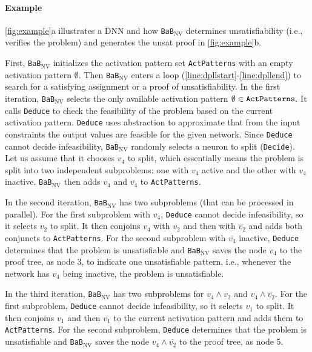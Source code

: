\documentclass[oneside,11pt,dvipsnames]{book}
\newcommand{\functiontextformat}[1]{\textrm{\texttt{#1}}}
\newcommand{\bab}{\texttt{BaB$_{\text{NV}}$}}
\begin{document}
\paragraph{Example} \autoref{fig:example}a illustrates a DNN and how \bab{} determines unsatisfiability (i.e., verifies the problem) and generates the unsat proof in \autoref{fig:example}b.

First, \bab{} initializes the activation pattern set \functiontextformat{ActPatterns} with an empty activation pattern $\emptyset$. Then \bab{} enters a loop (\autoref{line:dpllstart}-\autoref{line:dpllend}) to search for a satisfying assignment or a proof of unsatisfiability. In the first iteration, \bab{} selects the only available activation pattern $\emptyset \in \functiontextformat{ActPatterns}$. 
It calls \functiontextformat{Deduce} to check the feasibility of the problem based on the current activation pattern. \functiontextformat{Deduce} uses abstraction to approximate that from the input constraints the output values are feasible for the given network. 
Since \functiontextformat{Deduce} cannot decide infeasibility, \bab{} randomly selects a neuron to split (\functiontextformat{Decide}). Let us assume that it chooses $v_4$ to split, which essentially means the problem is split into two independent subproblems: one with $v_4$ active and the other with $v_4$ inactive.
\bab{} then adds $v_4$ and $\overline{v_4}$ to \functiontextformat{ActPatterns}.

In the second iteration, \bab{} has two subproblems (that can be processed in parallel). For the first subproblem with $v_4$, \functiontextformat{Deduce} cannot decide infeasibility, so it selects $v_2$ to split. It then conjoins $v_4$ with $v_2$ and then with $\overline{v_2}$ and adds both conjuncts to \texttt{ActPatterns}. 
For the second subproblem with $\overline{v_4}$ inactive, \functiontextformat{Deduce} determines that the problem is unsatisfiable and \bab{} saves the node $v_4$ to the proof tree, as node 3, to indicate one unsatisfiable pattern, i.e., whenever the network has $v_4$ being inactive, the problem is unsatisfiable.

In the third iteration, \bab{} has two subproblems for $v_4 \land v_2$ and $v_4 \land \overline{v_2}$. For the first subproblem, \functiontextformat{Deduce} cannot decide infeasibility, so it selects $v_1$ to split. It then conjoins $v_1$ and then $\overline{v_1}$ to the current activation pattern and adds them to \functiontextformat{ActPatterns}. For the second subproblem, \functiontextformat{Deduce} determines that the problem is unsatisfiable and \bab{} saves the node $v_4 \land \overline{v_2}$ to the proof tree, as node 5.
\end{document}
